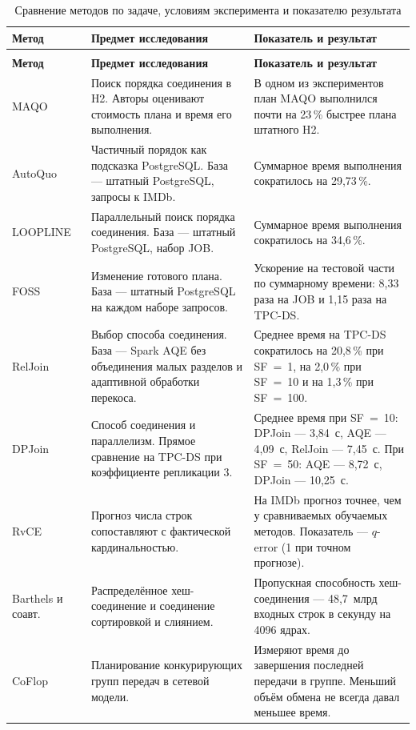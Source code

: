 \documentclass[a4paper, final]{article}
\renewcommand{\arraystretch}{1.4} %
\begin{document}
	\begingroup
	\small
	\setlength{\tabcolsep}{4pt}
	\renewcommand{\arraystretch}{1.15}
	\begin{longtable}{@{}>{\raggedright\arraybackslash}p{.20\linewidth}>{\raggedright\arraybackslash}p{.34\linewidth}>{\raggedright\arraybackslash}p{}@{}}
		\caption{Сравнение методов по задаче, условиям эксперимента и показателю результата}\label{tab:plan-methods}\\
		\toprule
		\textbf{Метод} & \textbf{Предмет исследования} & \textbf{Показатель и результат}\\
		\midrule
		\endfirsthead
		\multicolumn{3}{l}{Продолжение таблицы~\ref{tab:plan-methods}}\\
		\toprule
		\textbf{Метод} & \textbf{Предмет исследования} & \textbf{Показатель и результат}\\
		\midrule
		\endhead
		\bottomrule
		\endfoot
		MAQO~\cite{goncalves2014} & Поиск порядка соединения в H2. Авторы оценивают стоимость плана и время его выполнения. & В одном из экспериментов план MAQO выполнился почти на 23\,\% быстрее плана штатного H2. \\[2pt]
		AutoQuo~\cite{autoquo2024} & Частичный порядок как подсказка PostgreSQL. База --- штатный PostgreSQL, запросы к IMDb. & Суммарное время выполнения сократилось на 29,73\,\%. \\[2pt]
		LOOPLINE~\cite{loopline2025} & Параллельный поиск порядка соединения. База --- штатный PostgreSQL, набор JOB. & Суммарное время выполнения сократилось на 34,6\,\%. \\[2pt]
		FOSS~\cite{foss2024} & Изменение готового плана. База --- штатный PostgreSQL на каждом наборе запросов. & Ускорение на тестовой части по суммарному времени: 8,33 раза на JOB и 1,15 раза на TPC-DS. \\[2pt]
		RelJoin~\cite{liang2024} & Выбор способа соединения. База --- Spark AQE без объединения малых разделов и адаптивной обработки перекоса. & Среднее время на TPC-DS сократилось на 20,8\,\% при SF~=~1, на 2,0\,\% при SF~=~10 и на 1,3\,\% при SF~=~100. \\[2pt]
		DPJoin~\cite{turkmen2026} & Способ соединения и параллелизм. Прямое сравнение на TPC-DS при коэффициенте репликации 3. & Среднее время при SF~=~10: DPJoin --- 3,84~с, AQE --- 4,09~с, RelJoin --- 7,45~с. При SF~=~50: AQE --- 8,72~с, DPJoin --- 10,25~с. \\[2pt]
		RvCE~\cite{wang2024} & Прогноз числа строк сопоставляют с фактической кардинальностью. & На IMDb прогноз точнее, чем у сравниваемых обучаемых методов. Показатель --- $q$-error (1 при точном прогнозе). \\[2pt]
		Barthels и соавт.~\cite{barthels2017} & Распределённое хеш-соединение и соединение сортировкой и слиянием. & Пропускная способность хеш-соединения --- 48,7~млрд входных строк в секунду на 4096 ядрах. \\[2pt]
		CoFlop~\cite{coflop2023} & Планирование конкурирующих групп передач в сетевой модели. & Измеряют время до завершения последней передачи в группе. Меньший объём обмена не всегда давал меньшее время. \\[2pt]
	\end{longtable}
	\endgroup
	
\end{document}

